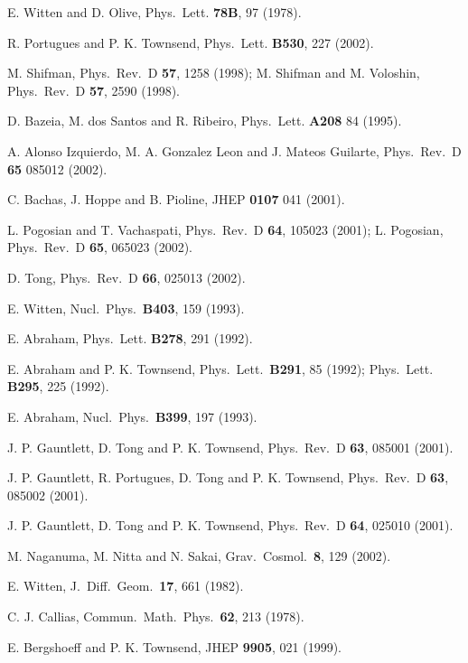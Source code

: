 \documentclass[a4paper,preprint,preprintnumbers,amsmath,amssymb]{revtex4}
\begin{document}
\begin{thebibliography}{99} 

E. Witten and D. Olive, Phys.\ Lett. {\bf 78B}, 97 (1978).

R. Portugues and P. K. Townsend, Phys.\ Lett. {\bf B530}, 227 (2002).

M. Shifman, Phys.\ Rev.\ D {\bf 57}, 1258 (1998);
M. Shifman and M. Voloshin,  Phys.\ Rev.\ D {\bf 57}, 2590 (1998).

D. Bazeia, M. dos Santos and R. Ribeiro,  Phys.\ Lett. {\bf A208} 84 (1995).

A. Alonso Izquierdo, M. A. Gonzalez Leon and J. Mateos Guilarte,
Phys.\ Rev.\ D  {\bf 65} 085012 (2002).

C. Bachas, J. Hoppe and B. Pioline, JHEP {\bf 0107} 041 (2001).
 
L. Pogosian and T. Vachaspati, Phys.\ Rev.\ D {\bf 64}, 105023 (2001);
L. Pogosian,  Phys.\ Rev.\ D {\bf 65}, 065023 (2002). 

D. Tong,  Phys.\ Rev.\ D {\bf 66}, 025013 (2002).

E. Witten, Nucl.\ Phys.\ {\bf B403}, 159 (1993).

E. Abraham, Phys.\ Lett. {\bf B278}, 291 (1992). 

E. Abraham and P. K. Townsend, Phys.\ Lett.\ {\bf B291}, 85 (1992);
 Phys.\ Lett. {\bf B295}, 225 (1992).

E. Abraham, Nucl.\ Phys.\ {\bf B399}, 197 (1993).

J. P. Gauntlett, D. Tong and P. K. Townsend,
Phys.\ Rev.\ D {\bf 63}, 085001 (2001).

J. P. Gauntlett, R. Portugues, D. Tong and P. K. Townsend,
Phys.\ Rev.\ D {\bf 63}, 085002 (2001).

J. P. Gauntlett, D. Tong and P. K. Townsend,  
Phys.\ Rev.\ D {\bf 64}, 025010 (2001).

M. Naganuma, M. Nitta and N. Sakai,
Grav.\ Cosmol.\ {\bf 8}, 129 (2002). 

E. Witten, J.\ Diff.\ Geom.\ {\bf 17}, 661 (1982).
 
C. J. Callias, Commun.\ Math.\ Phys.\ {\bf 62}, 213 (1978).

E. Bergshoeff and P. K. Townsend, JHEP {\bf 9905}, 021 (1999).


\end{thebibliography}
\end{document}
